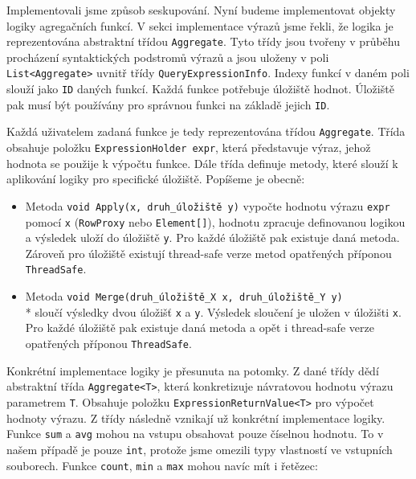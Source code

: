 Implementovali jsme způsob seskupování.
Nyní budeme implementovat objekty logiky agregačních funkcí.
V sekci implementace výrazů jsme řekli, že logika je reprezentována abstraktní třídou \texttt{Aggregate}.
Tyto třídy jsou tvořeny v průběhu procházení syntaktických podstromů výrazů a jsou uloženy v poli \texttt{List<Aggregate>} uvnitř třídy \texttt{QueryExpressionInfo}.
Indexy funkcí v daném poli slouží jako \texttt{ID} daných funkcí.
Každá funkce potřebuje úložiště hodnot.
Úložiště pak musí být používány pro správnou funkci na základě jejich \texttt{ID}.

Každá uživatelem zadaná funkce je tedy reprezentována třídou \texttt{Aggregate}.
Třída obsahuje položku \texttt{ExpressionHolder expr}, která představuje výraz, jehož hodnota se použije k výpočtu funkce.
Dále třída definuje metody, které slouží k aplikování logiky pro specifické úložiště.
Popíšeme je obecně:
\begin{itemize}
\item Metoda \texttt{void Apply(x, druh\_úložiště y)} vypočte hodnotu výrazu \texttt{expr} pomocí \texttt{x} (\texttt{RowProxy} nebo \texttt{Element[]}), hodnotu zpracuje definovanou logikou a výsledek uloží do úložiště \texttt{y}.
Pro každé úložiště pak existuje daná metoda.
Zároveň pro úložiště existují thread-safe verze metod opatřených příponou \texttt{ThreadSafe}.

\item Metoda \texttt{void Merge(druh\_úložiště\_X x, druh\_úložiště\_Y y)}\\* sloučí výsledky dvou úložišť \texttt{x} a \texttt{y}. 
Výsledek sloučení je uložen v úložišti \texttt{x}.
Pro každé úložiště pak existuje daná metoda a opět i thread-safe verze opatřených příponou \texttt{ThreadSafe}.
\end{itemize}
Konkrétní implementace logiky je přesunuta na potomky.
Z dané třídy dědí abstraktní třída \texttt{Aggregate<T>}, která konkretizuje návratovou hodnotu výrazu parametrem \texttt{T}.
Obsahuje položku \texttt{ExpressionReturnValue<T>} pro výpočet hodnoty výrazu.
Z třídy následně vznikají už konkrétní implementace logiky.
Funkce \texttt{sum} a \texttt{avg} mohou na vstupu obsahovat pouze číselnou hodnotu.
To v našem případě je pouze \texttt{int}, protože jsme omezili typy vlastností ve vstupních souborech.
Funkce \texttt{count}, \texttt{min} a \texttt{max} mohou navíc mít i řetězec:
